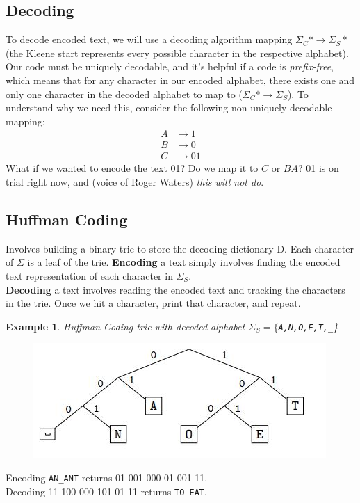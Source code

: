 \documentclass{report}
\newtheorem{ex}{Example}[section]
\begin{document}
\subsection{Decoding}
To decode encoded text, we will use a decoding algorithm mapping $\Sigma_C* \rightarrow \Sigma_S*$ (the Kleene start represents every possible character in the respective alphabet).\\
Our code must be uniquely decodable, and it's helpful if a code is \textit{prefix-free}, which means that for any character in our encoded alphabet, there exists one and only one character in the decoded alphabet to map to ($\Sigma_C* \rightarrow \Sigma_S$). To understand why we need this, consider the following non-uniquely decodable mapping:
\begin{align*}
A &\rightarrow 1 \\
B &\rightarrow 0 \\
C &\rightarrow 01
\end{align*}
What if we wanted to encode the text 01? Do we map it to $C$ or $BA$? 01 is on trial right now, and (voice of Roger Waters) \textit{this will not do}.
\subsection{Huffman Coding}
Involves building a binary trie to store the decoding dictionary D. Each character of $\Sigma$ is a leaf of the trie.
\textbf{Encoding} a text simply involves finding the encoded text representation of each character in $\Sigma_S$.\\
\textbf{Decoding} a text involves reading the encoded text and tracking the characters in the trie. Once we hit a character, print that character, and repeat.
\begin{ex}
Huffman Coding trie with decoded alphabet $\Sigma_S = \{$\texttt{A,N,O,E,T,\_}\}
\end{ex}
\begin{figure}[ht]
\begin{center}
\includegraphics[scale=0.8]{trie1.jpg}
\end{center}
\end{figure}
\noindent Encoding \texttt{AN\_ANT} returns 01 001 000 01 001 11.\\
Decoding 11 100 000 101 01 11 returns \texttt{TO\_EAT}.
\end{document}
